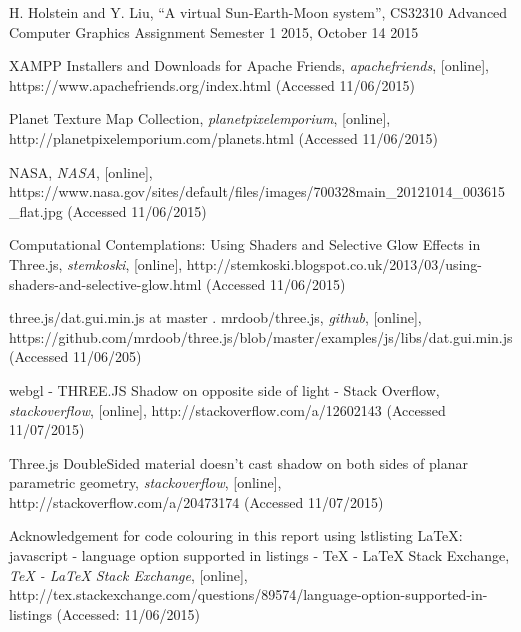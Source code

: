 \documentclass[12pt]{article}
\begin{document}
\clearpage


\begin{thebibliography}{5}

 H. Holstein and Y. Liu, ``A virtual Sun-Earth-Moon system'', CS32310 Advanced Computer Graphics Assignment Semester 1 2015, October 14 2015

 XAMPP Installers and Downloads for Apache Friends, {\em apachefriends}, [online], 
https://www.apachefriends.org/index.html (Accessed 11/06/2015)

 Planet Texture Map Collection, {\em planetpixelemporium}, [online],
http://planetpixelemporium.com/planets.html (Accessed 11/06/2015)

 NASA, {\em NASA}, [online], 
https://www.nasa.gov/sites/default/files/images/700328main\_20121014\_003615\_flat.jpg (Accessed 11/06/2015)

 Computational Contemplations: Using Shaders and Selective Glow Effects in Three.js, {\em stemkoski}, [online],
http://stemkoski.blogspot.co.uk/2013/03/using-shaders-and-selective-glow.html (Accessed 11/06/2015)

 three.js/dat.gui.min.js at master . mrdoob/three.js, {\em github}, [online],
https://github.com/mrdoob/three.js/blob/master/examples/js/libs/dat.gui.min.js (Accessed 11/06/205)

 webgl - THREE.JS Shadow on opposite side of light - Stack Overflow, {\em stackoverflow}, [online],
http://stackoverflow.com/a/12602143 (Accessed 11/07/2015)

 Three.js DoubleSided material doesn't cast shadow on both sides of planar parametric geometry, {\em stackoverflow}, [online],
http://stackoverflow.com/a/20473174 (Accessed 11/07/2015)

  Acknowledgement for code colouring in this report using lstlisting LaTeX: 
javascript - language option supported in listings - TeX - LaTeX Stack Exchange, {\em TeX - LaTeX Stack Exchange}, [online],
http://tex.stackexchange.com/questions/89574/language-option-supported-in-listings (Accessed: 11/06/2015)

\end{thebibliography}
\end{document}
